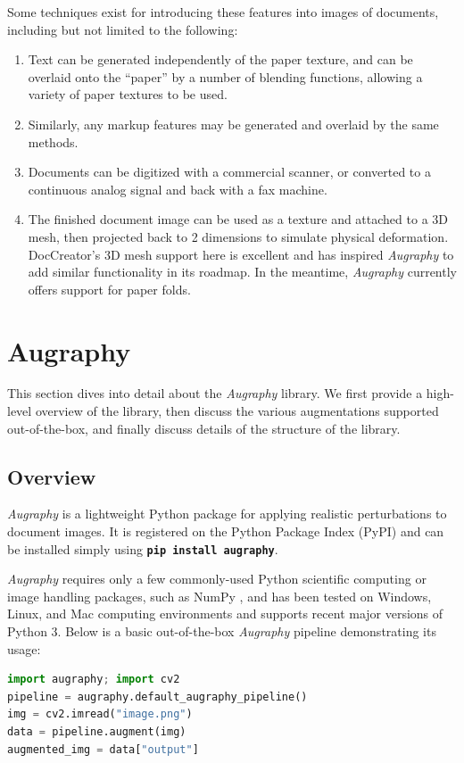 \documentclass[runningheads]{llncs}
\begin{document}
Some techniques exist for introducing these features into images of documents, including but not limited to the following:
\begin{enumerate}
\item Text can be generated independently of the paper texture, and can be overlaid onto the ``paper'' by a number of blending functions, allowing a variety of paper textures to be used.
\item Similarly, any markup features may be generated and overlaid by the same methods.
\item Documents can be digitized with a commercial scanner, or converted to a continuous analog signal and back with a fax machine.
\item The finished document image can be used as a texture and attached to a 3D mesh, then projected back to 2 dimensions to simulate physical deformation. DocCreator's 3D mesh support here is excellent and has inspired \emph{Augraphy} to add similar functionality in its roadmap.  In the meantime, \emph{Augraphy} currently offers support for paper folds.
\end{enumerate}

\section{Augraphy}
This section dives into detail about the \emph{Augraphy} library.
We first provide a high-level overview of the library, then discuss the various augmentations supported out-of-the-box, and finally discuss details of the structure of the library.

\subsection{Overview}

\emph{Augraphy} is a lightweight Python package for applying realistic perturbations to document images. It is registered on the Python Package Index (PyPI) and can be installed simply using \colorbox{superlightgray}{\textbf{\texttt{pip install augraphy}}}.

\emph{Augraphy} requires only a few commonly-used Python scientific computing or image handling packages, such as NumPy \cite{ref_numpy}, and has been tested on Windows, Linux, and Mac computing environments and supports recent major versions of Python 3.  Below is a basic out-of-the-box \emph{Augraphy} pipeline demonstrating its usage:

\begin{lstlisting}[language=Python, label={lst:sample-code}, caption={Augmenting a document image with \emph{Augraphy}.}]
import augraphy; import cv2
pipeline = augraphy.default_augraphy_pipeline()
img = cv2.imread("image.png")
data = pipeline.augment(img)
augmented_img = data["output"]
\end{lstlisting}
\end{document}
